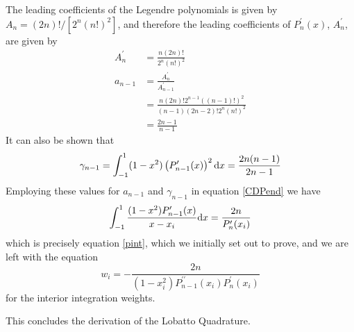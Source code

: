\documentclass[preprint]{revtex4}
\newcommand{\dx}{{\rm d}x}
\newcommand{\intunit}{\ensuremath{\int_{-1}^{1}}}
\begin{document}
The leading coefficients of the Legendre polynomials is given by $A_n=(2n)!/[2^n(n!)^2]$, and 
therefore the leading coefficients of $P_n^\prime(x)$, $A^\prime_n$, are given by  
\begin{align}
\label{Aprime}
A^\prime_n&=\frac{n(2n)!}{2^n(n!)^2} \\
a_{n-1}&=\frac{A^\prime_n}{A^\prime_{n-1}}\\
&=\frac{n(2n)!2^{n-1}((n-1)!)^2}{(n-1)(2n-2)!2^n(n!)^2} \\
&= \frac{2n-1}{n-1}
\end{align}
It can also be shown that 
\begin{equation}
\label{gammasolve}
\gamma_{n-1}=\intunit(1-x^2)\left(P_{n-1}^\prime(x)\right)^2 \dx = \frac{2n(n-1)}{2n-1}
\end{equation}
Employing these values for $a_{n-1}$ and $\gamma_{n-1}$ in equation \ref{CDPend}
we have 
\begin{equation}
\intunit \frac{(1-x^2)P_{n-1}^\prime(x)}{x-x_i}\dx = \frac{2n}{P_n^\prime(x_i)}
\end{equation}
which is precisely equation \ref{pint}, which we initially set out to prove, and we 
are left with the equation 
\begin{equation}
\label{weightform3}
w_i= -\frac{2n}{(1-x_i^2)P_{n-1}^{\prime\prime}(x_i)P_n^\prime(x_i)}
\end{equation}
for the interior integration weights. 

This concludes the derivation of the Lobatto Quadrature. 








\end{document}
